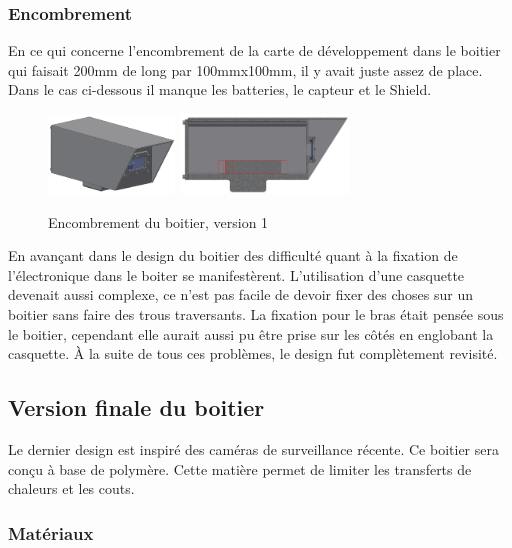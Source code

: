 \subsubsection{Encombrement}

En ce qui concerne l’encombrement de la carte de développement dans le boitier qui faisait 200mm de 
long par 100mmx100mm, il y avait juste assez de place. Dans le cas ci-dessous il manque les batteries, 
le capteur et le Shield.

\begin{figure}[H]
    \centering
    \includegraphics[width=0.3\textwidth]{Images/photos_PGA/boitierV3.PNG}
    \includegraphics[width=0.4\textwidth]{Images/photos_PGA/boitierV3enc.PNG}
    \caption{Encombrement du boitier, version 1}
    \label{fig:encombrementv1}
\end{figure}

En avançant dans le design du boitier des difficulté quant à la fixation de l’électronique dans le boiter 
se manifestèrent. L’utilisation d’une casquette devenait aussi complexe, ce n’est pas facile de devoir 
fixer des choses sur un boitier sans faire des trous traversants. La fixation pour le bras était pensée 
sous le boitier, cependant elle aurait aussi pu être prise sur les côtés en englobant la casquette. 
À la suite de tous ces problèmes, le design fut complètement revisité.

\subsection{Version finale du boitier}

Le dernier design est inspiré des caméras de surveillance récente. Ce boitier sera conçu à base de 
polymère. Cette matière permet de limiter les transferts de chaleurs et les couts.

\subsubsection{Matériaux}

